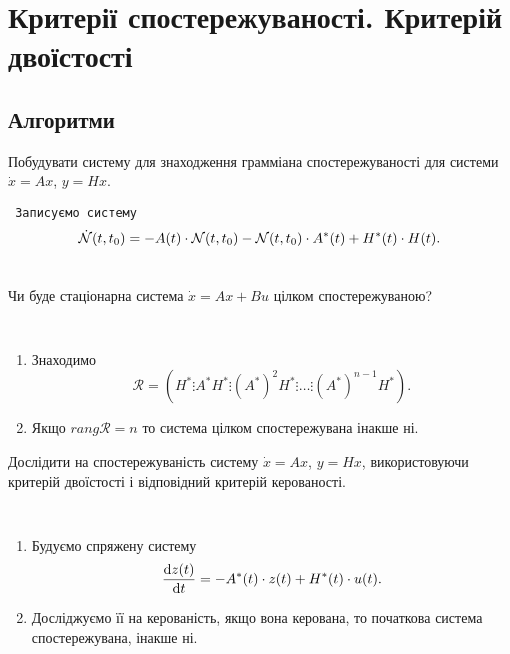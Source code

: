 \section{Критерії спостережуваності. Критерій двоїстості}

\subsection{Алгоритми}

\begin{problem*}
    Побудувати систему для знаходження грамміана спостережуваності для системи $\dot x = A x$, $y = H x$.
\end{problem*}

\begin{algorithm} \tt
    Записуємо систему \[ \dot {\mathcal{N}}(t, t_0) = -A(t) \cdot \mathcal{N}(t, t_0) - \mathcal{N}(t, t_0) \cdot A^*(t) + H^*(t) \cdot H(t). \]
\end{algorithm}

\begin{problem*}
    Чи буде стаціонарна система $\dot x = A x + B u$ цілком спостережуваною?
\end{problem*}

\begin{algorithm} \tt 
    \begin{enumerate}
        \item Знаходимо \[ \mathcal{R} = \left(H^* \vdots A^* H^* \vdots (A^*)^2 H^* \vdots \ldots \vdots (A^*)^{n-1} H^*\right).\] 
        \item Якщо $rang \mathcal{R} = n$ то система цілком спостережувана інакше ні.
    \end{enumerate}
\end{algorithm}

\begin{problem*}
    Дослідити на спостережуваність систему $\dot x = A x$, $y = H x$, використовуючи критерій двоїстості і відповідний критерій керованості.
\end{problem*}

\begin{algorithm} \tt
    \begin{enumerate}
        \item Будуємо спряжену систему \[ \frac{\mathop{}\!\mathrm{d} z(t)}{\mathop{}\!\mathrm{d} t} = - A^*(t) \cdot z(t) + H^*(t) \cdot u(t). \]
        \item Досліджуємо її на керованість, якщо вона керована, то по\-чат\-ко\-ва \allowbreak сис\-те\-ма спостережувана, інакше ні.
    \end{enumerate}
\end{algorithm}

